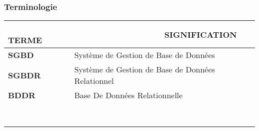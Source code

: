 \newpage

\def\termea{\bf \footnotesize SGBD}
\def\sensa{\footnotesize Système de Gestion de Base de Données}

\def\termeb{\bf \footnotesize SGBDR}
\def\sensb{\footnotesize Système de Gestion de Base de Données Relationnel}

\def\termec{\bf \footnotesize BDD}
\def\sensc{\footnotesize Base De Données}

\def\termec{\bf \footnotesize BDDR}
\def\sensc{\footnotesize Base De Données Relationnelle}

\def\termed{\bf \footnotesize }
\def\sensd{\footnotesize }

\def\termee{\bf \footnotesize }
\def\sense{\footnotesize }

\def\termef{\bf \footnotesize }
\def\sensf{\footnotesize }

\def\termeg{\bf \footnotesize }
\def\sensg{\footnotesize }

\def\termeh{\bf \footnotesize }
\def\sensh{\footnotesize }

\def\termei{\bf \footnotesize }
\def\sensi{\footnotesize }

\def\termej{\bf \footnotesize }
\def\sensj{\footnotesize }

\def\termek{\bf \footnotesize }
\def\sensk{\footnotesize }



\begin{center}
\subsubsection*{Terminologie}
\begin{tabular}{|p{5cm}|p{12cm}|}
\hline
{\bf ~~~~~ T{\scriptsize ERME}} &  {\bf ~~~~~~~~~~~~~~~~~~~ S{\scriptsize IGNIFICATION}}\\
\hline
\hline
\termea & \sensa\\
\hline
\termeb & \sensb\\
\hline
\termec & \sensc\\
\hline
\termed & \sensd\\
\hline
\termee & \sense\\
\hline
\termef & \sensf\\
\hline
\termeg & \sensg\\
\hline
\termeh & \sensh\\
\hline
\termei & \sensi\\
\hline
\termej & \sensj\\
\hline
\termek & \sensk\\
\hline

\end{tabular}
 
\end{center}
